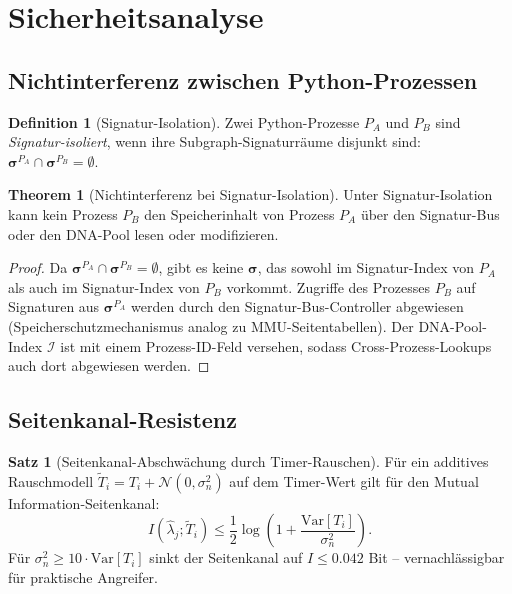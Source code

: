 ﻿\documentclass[a4paper,12pt]{article}
\theoremstyle{definition}
\newtheorem{definition}{Definition}[section]
\newtheorem{satz}{Satz}[section]
\newtheorem{theorem}{Theorem}[section]
\begin{document}
\section{Sicherheitsanalyse}

\subsection{Nichtinterferenz zwischen Python-Prozessen}

\begin{definition}[Signatur-Isolation]
  \label{def:isolation}
  Zwei Python-Prozesse $P_A$ und $P_B$ sind \emph{Signatur-isoliert},
  wenn ihre Subgraph-Signaturräume disjunkt sind:
  $\boldsymbol{\sigma}^{P_A} \cap \boldsymbol{\sigma}^{P_B} = \emptyset$.
\end{definition}

\begin{theorem}[Nichtinterferenz bei Signatur-Isolation]
  \label{thm:nichtinterferenz}
  Unter Signatur-Isolation kann kein Prozess $P_B$ den Speicherinhalt
  von Prozess $P_A$ über den Signatur-Bus oder den DNA-Pool lesen oder
  modifizieren.
\end{theorem}

\begin{proof}
  Da $\boldsymbol{\sigma}^{P_A} \cap \boldsymbol{\sigma}^{P_B} = \emptyset$,
  gibt es keine $\boldsymbol{\sigma}$, das sowohl im Signatur-Index von
  $P_A$ als auch im Signatur-Index von $P_B$ vorkommt.
  Zugriffe des Prozesses $P_B$ auf Signaturen aus $\boldsymbol{\sigma}^{P_A}$
  werden durch den Signatur-Bus-Controller abgewiesen
  (Speicherschutzmechanismus analog zu MMU-Seitentabellen).
  Der DNA-Pool-Index $\mathcal{I}$ ist mit einem Prozess-ID-Feld versehen,
  sodass Cross-Prozess-Lookups auch dort abgewiesen werden.
\end{proof}

\subsection{Seitenkanal-Resistenz}

\begin{satz}[Seitenkanal-Abschwächung durch Timer-Rauschen]
  \label{satz:seitenkanal}
  Für ein additives Rauschmodell $\tilde{T}_i = T_i + \mathcal{N}(0, \sigma_n^2)$
  auf dem Timer-Wert gilt für den Mutual Information-Seitenkanal:
  \begin{equation}
    I(\hat\lambda_j; \tilde{T}_i) \le \frac{1}{2}
    \log\!\left(1 + \frac{\mathrm{Var}[T_i]}{\sigma_n^2}\right).
  \end{equation}
  Für $\sigma_n^2 \ge 10 \cdot \mathrm{Var}[T_i]$ sinkt der Seitenkanal
  auf $I \le 0.042$ Bit -- vernachlässigbar für praktische Angreifer.
\end{satz}
\end{document}
